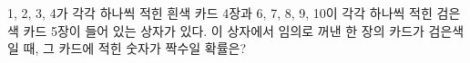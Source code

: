 1, 2, 3, 4가 각각 하나씩 적힌 흰색 카드 4장과 6, 7, 8, 9, 10이 각각 하나씩 적힌 검은색 카드 5장이 들어 있는 상자가 있다. 이 상자에서 임의로 꺼낸 한 장의 카드가 검은색일 때, 그 카드에 적힌 숫자가 짝수일 확률은?
